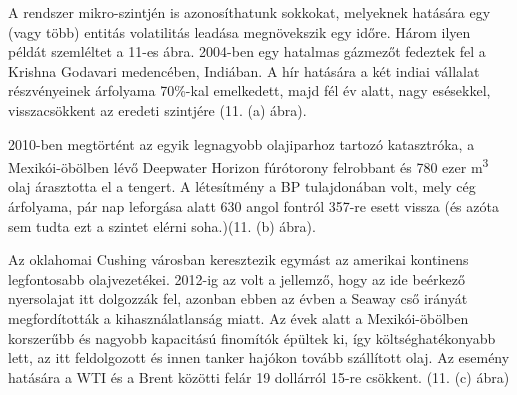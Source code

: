 \documentclass[12pt,bibliography=totoc]{article}
\begin{document}
A rendszer mikro-szintjén is azonosíthatunk sokkokat, melyeknek hatására egy (vagy több) entitás volatilitás leadása megnövekszik egy időre. Három ilyen példát szemléltet a 11-es ábra. 2004-ben egy hatalmas gázmezőt fedeztek fel a Krishna Godavari medencében, Indiában. A hír hatására a két indiai vállalat részvényeinek árfolyama 70\%-kal emelkedett, majd fél év alatt, nagy esésekkel, visszacsökkent az eredeti szintjére (11. (a) ábra). 

2010-ben megtörtént az egyik legnagyobb olajiparhoz tartozó katasztróka, a Mexikói-öbölben lévő Deepwater Horizon fúrótorony felrobbant és 780 ezer m\textsuperscript{3} olaj árasztotta el a tengert. A létesítmény a BP tulajdonában volt, mely cég árfolyama, pár nap leforgása alatt 630 angol fontról 357-re esett vissza (és azóta sem tudta ezt a szintet elérni soha.)(11. (b) ábra).

Az oklahomai Cushing városban keresztezik egymást az amerikai kontinens legfontosabb olajvezetékei. 2012-ig az volt a jellemző, hogy az ide beérkező nyersolajat itt dolgozzák fel, azonban ebben az évben a Seaway cső irányát megfordították a kihasználatlanság miatt. Az évek alatt a Mexikói-öbölben korszerűbb és nagyobb kapacitású finomítók épültek ki, így költséghatékonyabb lett, az itt feldolgozott és innen tanker hajókon tovább szállított olaj. Az esemény hatására a WTI és a Brent közötti felár 19 dollárról 15-re csökkent. (11. (c) ábra)

\end{document}
